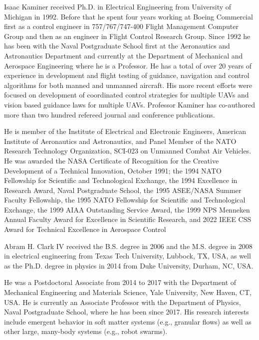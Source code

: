 \documentclass[journal]{IEEEtran} %
\begin{document}
\begin{IEEEbiography}
{Isaac Kaminer} received Ph.D. in Electrical Engineering from University of Michigan in 1992. Before that he spent four years working at Boeing Commercial first as a control engineer in 757/767/747-400 Flight Management Computer Group and then as an engineer in Flight Control Research Group. Since 1992 he has been with the Naval Postgraduate School first at the Aeronautics and Astronautics Department and currently at the Department of Mechanical and Aerospace Engineering where he is a Professor. He has a total of over 20 years of experience in development and flight testing of guidance, navigation and control algorithms for both manned and unmanned aircraft. His more recent efforts were focused on development of coordinated control strategies for multiple UAVs and vision based guidance laws for multiple UAVs. Professor Kaminer has co-authored more than two hundred refereed journal and conference publications.
 
He is member of the Institute of Electrical and Electronic Engineers, American Institute of Aeronautics and Astronautics, and Panel Member of the NATO Research Technology Organization, SCI-023 on Unmanned Combat Air Vehicles. He was awarded the NASA Certificate of Recognition for the Creative Development of a Technical Innovation, October 1991; the 1994 NATO Fellowship for Scientific and Technological Exchange, the 1994 Excellence in Research Award, Naval Postgraduate School, the 1995 ASEE/NASA Summer Faculty Fellowship, the 1995 NATO Fellowship for Scientific and Technological Exchange, the 1999 AIAA Outstanding Service Award, the 1999 NPS Menneken Annual Faculty Award for Excellence in Scientific Research, and 2022 IEEE CSS Award for Technical Excellence in Aerospace Control 
\end{IEEEbiography}


\begin{IEEEbiography}
{Abram H. Clark IV} received the B.S. degree in 2006 and the M.S. degree in 2008 in electrical engineering from Texas Tech University, Lubbock, TX, USA, as well as the Ph.D. degree in physics in 2014 from Duke University, Durham, NC, USA.

He was a Postdoctoral Associate from 2014 to 2017 with the Department of Mechanical Engineering and Materials Science, Yale University, New Haven, CT, USA. He is currently an Associate Professor with the Department of Physics, Naval Postgraduate School, where he has been since 2017. His research interests include emergent behavior in soft matter systems (e.g., granular flows) as well as other large, many-body systems (e.g., robot swarms).
\end{IEEEbiography}
\end{document}
